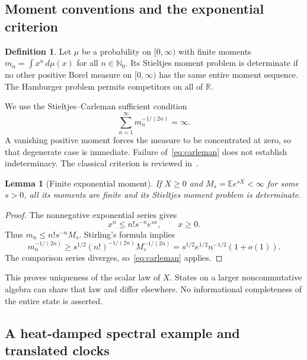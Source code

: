 \documentclass[11pt]{article}
\newtheorem{lemma}[theorem]{Lemma}
\theoremstyle{definition}
\newtheorem{definition}[theorem]{Definition}
\newcommand{\N}{\mathbb N_0}
\newcommand{\R}{\mathbb R}
\newcommand{\E}{\mathbb E}
\begin{document}
\subsection{Moment conventions and the exponential criterion}

\begin{definition}
Let $\mu$ be a probability on $[0,\infty)$ with finite moments $m_n=\int x^n\,d\mu(x)$ for all $n\in\N$.
Its Stieltjes moment problem is determinate if no other positive Borel measure on $[0,\infty)$ has the same entire moment sequence.
The Hamburger problem permits competitors on all of $\R$.
\end{definition}

We use the Stieltjes--Carleman sufficient condition
\begin{equation}
 \sum_{n=1}^\infty m_n^{-1/(2n)}=\infty.
 \label{eq:carleman}
\end{equation}
A vanishing positive moment forces the measure to be concentrated at zero, so that degenerate case is immediate.
Failure of~\eqref{eq:carleman} does not establish indeterminacy.
The classical criterion is reviewed in~\cite[Corollary 4.5]{Simon1998}.

\begin{lemma}[Finite exponential moment]
\label{lem:mgf}
If $X\geq0$ and $M_s=\E e^{sX}<\infty$ for some $s>0$, all its moments are finite and its Stieltjes moment problem is determinate.
\end{lemma}
\begin{proof}
The nonnegative exponential series gives
\begin{equation}
 x^n\leq n!s^{-n}e^{sx},\qquad x\geq0.
\end{equation}
Thus $m_n\leq n!s^{-n}M_s$.
Stirling's formula implies
\begin{equation}
 m_n^{-1/(2n)}\geq
 s^{1/2}(n!)^{-1/(2n)}M_s^{-1/(2n)}
 =s^{1/2}e^{1/2}n^{-1/2}(1+o(1)).
\end{equation}
The comparison series diverges, so~\eqref{eq:carleman} applies.
\end{proof}

This proves uniqueness of the scalar law of $X$.
States on a larger noncommutative algebra can share that law and differ elsewhere.
No informational completeness of the entire state is asserted.

\subsection{A heat-damped spectral example and translated clocks}
\end{document}
